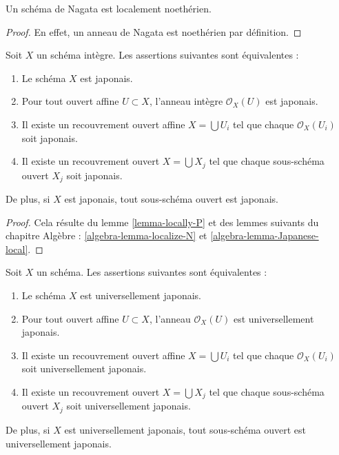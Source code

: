 \begin{lemma}
\label{lemma-nagata-locally-Noetherian}
Un schéma de Nagata est localement noethérien.
\end{lemma}

\begin{proof}
En effet, un anneau de Nagata est noethérien par définition.
\end{proof}

\begin{lemma}
\label{lemma-locally-Japanese}
Soit $X$ un schéma intègre. Les assertions suivantes sont équivalentes :
\begin{enumerate}
\item Le schéma $X$ est japonais.
\item Pour tout ouvert affine $U \subset X$, l'anneau intègre $\mathcal{O}_X(U)$
est japonais.
\item Il existe un recouvrement ouvert affine $X = \bigcup U_i$
tel que chaque $\mathcal{O}_X(U_i)$ soit japonais.
\item Il existe un recouvrement ouvert $X = \bigcup X_j$
tel que chaque sous-schéma ouvert $X_j$ soit japonais.
\end{enumerate}
De plus, si $X$ est japonais, tout sous-schéma ouvert
est japonais.
\end{lemma}

\begin{proof}
Cela résulte du lemme \ref{lemma-locally-P} et des
lemmes suivants du chapitre Algèbre : \ref{algebra-lemma-localize-N} et
\ref{algebra-lemma-Japanese-local}.
\end{proof}

\begin{lemma}
\label{lemma-locally-universally-Japanese}
Soit $X$ un schéma. Les assertions suivantes sont équivalentes :
\begin{enumerate}
\item Le schéma $X$ est universellement japonais.
\item Pour tout ouvert affine $U \subset X$, l'anneau $\mathcal{O}_X(U)$
est universellement japonais.
\item Il existe un recouvrement ouvert affine $X = \bigcup U_i$
tel que chaque $\mathcal{O}_X(U_i)$ soit universellement japonais.
\item Il existe un recouvrement ouvert $X = \bigcup X_j$
tel que chaque sous-schéma ouvert $X_j$ soit universellement japonais.
\end{enumerate}
De plus, si $X$ est universellement japonais, tout sous-schéma ouvert
est universellement japonais.
\end{lemma}

